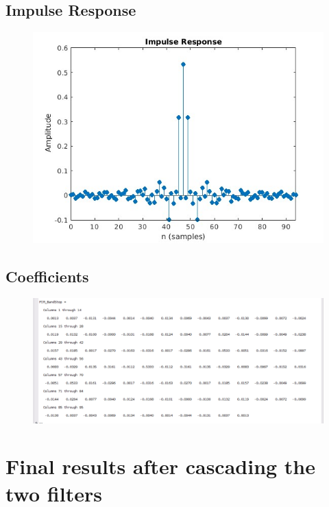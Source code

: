\documentclass{article}
\begin{document}
\subsection{Impulse Response}
\begin{figure}[H]
\hspace*{-2.5cm}
    \centering
    \includegraphics[width=1.5\linewidth, height=0.6\textheight]{IR_BS.jpg}
    \label{fig:my_label}
\end{figure}

\subsection{Coefficients}
\begin{figure}[H]
\hspace*{-2.5cm}
    \centering
    \includegraphics[width=1.5\linewidth, height=0.55\textheight]{coeff_BS.png}
    \label{fig:my_label}
\end{figure}

\section{Final results after cascading the two filters}
\end{document}
